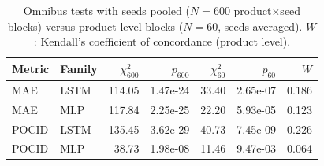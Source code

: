 \begin{table}[ht]
\centering\small
\caption{Omnibus tests with seeds pooled ($N=600$ product$\times$seed blocks) versus product-level blocks ($N=60$, seeds averaged). $W$: Kendall's coefficient of concordance (product level).}
\label{tab:omnibus}
\begin{tabular}{llrrrrr}
\toprule
Metric & Family & $\chi^2_{600}$ & $p_{600}$ & $\chi^2_{60}$ & $p_{60}$ & $W$ \\
\midrule
MAE & LSTM & 114.05 & 1.47e-24 & 33.40 & 2.65e-07 & 0.186 \\
MAE & MLP & 117.84 & 2.25e-25 & 22.20 & 5.93e-05 & 0.123 \\
POCID & LSTM & 135.45 & 3.62e-29 & 40.73 & 7.45e-09 & 0.226 \\
POCID & MLP & 38.73 & 1.98e-08 & 11.46 & 9.47e-03 & 0.064 \\
\bottomrule
\end{tabular}
\end{table}
